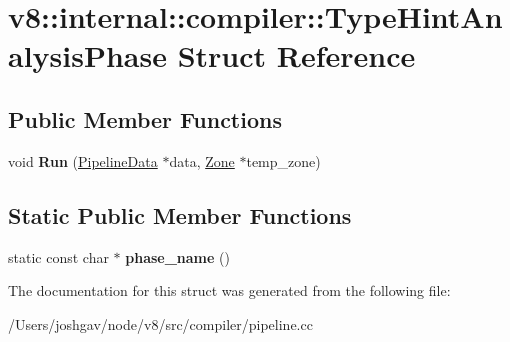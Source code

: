 \hypertarget{structv8_1_1internal_1_1compiler_1_1_type_hint_analysis_phase}{}\section{v8\+:\+:internal\+:\+:compiler\+:\+:Type\+Hint\+Analysis\+Phase Struct Reference}
\label{structv8_1_1internal_1_1compiler_1_1_type_hint_analysis_phase}
\subsection*{Public Member Functions}
\begin{DoxyCompactItemize}
\item 
void {\bfseries Run} (\hyperlink{classv8_1_1internal_1_1compiler_1_1_pipeline_data}{Pipeline\+Data} $\ast$data, \hyperlink{classv8_1_1internal_1_1_zone}{Zone} $\ast$temp\+\_\+zone)\hypertarget{structv8_1_1internal_1_1compiler_1_1_type_hint_analysis_phase_a9863f5bf5029cb9cac36b351d638fd4c}{}\label{structv8_1_1internal_1_1compiler_1_1_type_hint_analysis_phase_a9863f5bf5029cb9cac36b351d638fd4c}

\end{DoxyCompactItemize}
\subsection*{Static Public Member Functions}
\begin{DoxyCompactItemize}
\item 
static const char $\ast$ {\bfseries phase\+\_\+name} ()\hypertarget{structv8_1_1internal_1_1compiler_1_1_type_hint_analysis_phase_a9dfc8da07fbbb6ddbe1dac24898662ca}{}\label{structv8_1_1internal_1_1compiler_1_1_type_hint_analysis_phase_a9dfc8da07fbbb6ddbe1dac24898662ca}

\end{DoxyCompactItemize}


The documentation for this struct was generated from the following file\+:\begin{DoxyCompactItemize}
\item 
/\+Users/joshgav/node/v8/src/compiler/pipeline.\+cc\end{DoxyCompactItemize}
